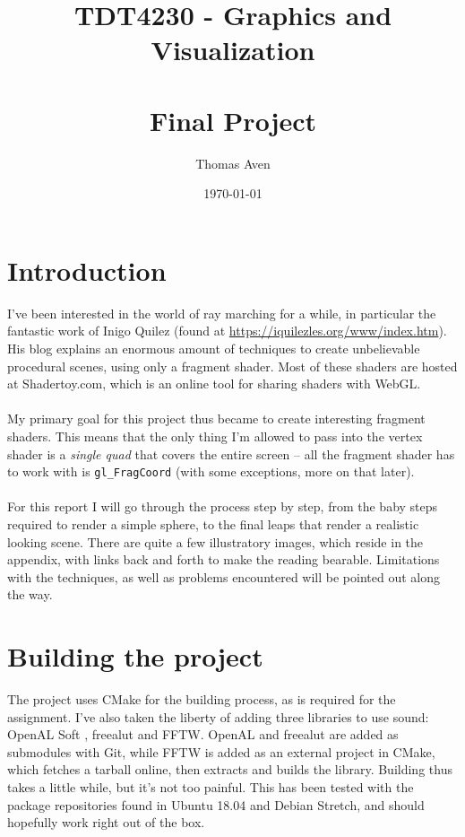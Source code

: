 \documentclass[abstract=off,oneside]{scrreprt}
\author{Thomas Aven}
\date{\today}
\title{TDT4230 - Graphics and Visualization \large \\~\\ Final Project}
\begin{document}
\maketitle

\section*{Introduction}
\label{sec-1}
I've been interested in the world of ray marching for a while, in
particular the fantastic work of Inigo Quilez (found at
\url{https://iquilezles.org/www/index.htm}). His blog explains an enormous
amount of techniques to create unbelievable procedural scenes, using
only a fragment shader. Most of these shaders are hosted at
Shadertoy.com, which is an online tool for sharing shaders with WebGL.
\\\\
My primary goal for this project thus became to create interesting
fragment shaders. This means that the only thing I'm allowed to pass
into the vertex shader is a \emph{single quad} that covers the
entire screen -- all the fragment shader has to work with is
\verb~gl_FragCoord~ (with some exceptions, more on that later).
\\\\
For this report I will go through the process step by step, from the
baby steps required to render a simple sphere, to the final leaps that
render a realistic looking scene. There are quite a few illustratory
images, which reside in the appendix, with links back and forth to
make the reading bearable. Limitations with the techniques, as well as
problems encountered will be pointed out along the way.

\section*{Building the project}
\label{sec-2}
The project uses CMake for the building process, as is required for
the assignment. I've also taken the liberty of adding three libraries
to use sound: OpenAL Soft , freealut and FFTW. OpenAL and freealut are
added as submodules with Git, while FFTW is added as an external
project in CMake, which fetches a tarball online, then extracts and
builds the library. Building thus takes a little while, but it's not
too painful. This has been tested with the package repositories found
in Ubuntu 18.04 and Debian Stretch, and should hopefully work right
out of the box.
\end{document}
